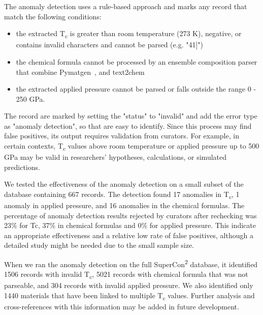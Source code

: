 \documentclass[a4paper]{article}
\begin{document}
The anomaly detection uses a rule-based approach and marks any record that match the following conditions:
\begin{itemize}
    \item the extracted T\textsubscript{c} is greater than room temperature (273 K), negative, or contains invalid characters and cannot be parsed (e.g. "41]")
    \item the chemical formula cannot be processed by an ensemble composition parser that combine Pymatgen~\cite{Ong2013}, and text2chem~\cite{kononova_text-mined_2019} 
    \item the extracted applied pressure cannot be parsed or falls outside the range 0 - 250 GPa.
\end{itemize}

The record are marked by setting the "status" to "invalid" and add the error type as "anomaly detection", so that are easy to identify.
Since this process may find false positives, its output requires validation from curators. 
For example, in certain contexts, T\textsubscript{c} values above room temperature or applied pressure up to 500 GPa may be valid in researchers' hypotheses, calculations, or simulated predictions. 

We tested the effectiveness of the anomaly detection on a small subset of the database containing 667 records. 
The detection found 17 anomalies in T\textsubscript{c}, 1 anomaly in applied pressure, and 16 anomalies in the chemical formulas. 
The percentage of anomaly detection results rejected by curators after rechecking was 23\% for Tc, 37\% in chemical formulas and 0\% for applied pressure. 
This indicate an appropriate effectiveness and a relative low rate of false positives, although a detailed study might be needed due to the small sample size.

When we ran the anomaly detection on the full SuperCon\textsuperscript{2} database, it identified 1506 records with invalid T\textsubscript{c}, 5021 records with chemical formula that was not parseable, and 304 records with invalid applied pressure.  
We also identified only 1440 materials that have been linked to multiple T\textsubscript{c} values. Further analysis and cross-references with this information may be added in future development. 
\end{document}
